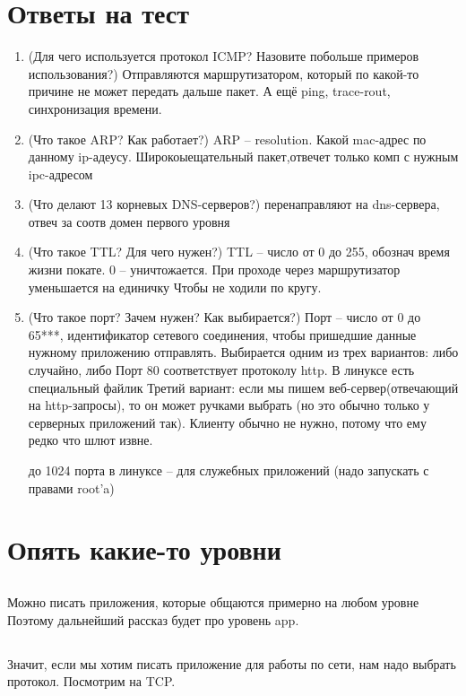 \section{Ответы на тест}
\begin{enumerate}
\item
	(Для чего используется протокол ICMP? Назовите побольше примеров использования?)
	Отправляются маршрутизатором, который по какой-то причине не может передать дальше пакет.
	А ещё ping, trace-rout, синхронизация времени.
\item
	(Что такое ARP? Как работает?)
	ARP -- resolution. Какой mac-адрес по данному ip-адеусу. Широкоыещательный пакет,отвечет только комп с нужным ipc-адресом
\item
	(Что делают 13 корневых DNS-серверов?)
	перенаправляют на dns-сервера, отвеч за соотв домен первого уровня
\item
	(Что такое TTL? Для чего нужен?)
	TTL -- число от 0 до 255, обознач время жизни покате. 0 -- уничтожается. 
	При проходе через маршрутизатор уменьшается на единичку
	Чтобы не ходили по кругу.
\item
	(Что такое порт? Зачем нужен? Как выбирается?)
	Порт -- число от 0 до 65***, идентификатор сетевого соединения, чтобы пришедшие данные нужному приложению отправлять.
	Выбирается одним из трех вариантов: либо случайно, либо 
	Порт 80 соответствует протоколу http.
	В линуксе есть специальный файлик
	Третий вариант: если мы пишем веб-сервер(отвечающий на http-запросы), 
	то он может ручками выбрать (но это обычно только у серверных приложений так).
	Клиенту обычно не нужно, потому что ему редко что шлют извне. 
	
	до 1024 порта в линуксе -- для служебных приложений (надо запускать с правами root'a)
\end{enumerate}

\section{Опять какие-то уровни}
\subsection{}
Можно писать приложения, которые общаются примерно на любом уровне
Поэтому дальнейший рассказ будет про уровень app.

\subsection{}
Значит, если мы хотим писать приложение для работы по сети, нам надо выбрать протокол.
Посмотрим на TCP.


